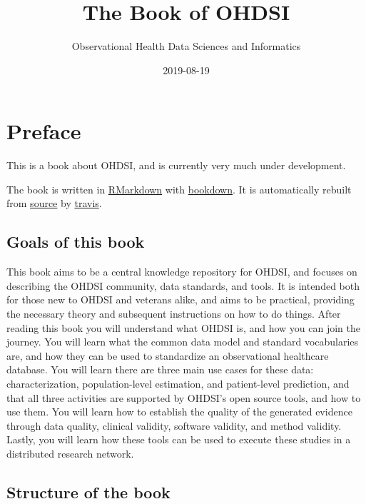 \documentclass[11pt]{book}
\title{The Book of OHDSI}
\author{Observational Health Data Sciences and Informatics}
\date{2019-08-19}
\theoremstyle{definition}
\theoremstyle{definition}
\theoremstyle{definition}
\theoremstyle{remark}
\begin{document}
\maketitle

{
\setcounter{tocdepth}{1}
\tableofcontents
}
\hypertarget{preface}{%
\chapter*{Preface}\label{preface}}

This is a book about OHDSI, and is currently very much under development.

The book is written in \href{https://rmarkdown.rstudio.com}{RMarkdown} with \href{https://bookdown.org}{bookdown}. It is automatically rebuilt from \href{https://github.com/OHDSI/TheBookOfOhdsi}{source} by \href{http://travis-ci.org/}{travis}.

\hypertarget{goals-of-this-book}{%
\section*{Goals of this book}\label{goals-of-this-book}}

This book aims to be a central knowledge repository for OHDSI, and focuses on describing the OHDSI community, data standards, and tools. It is intended both for those new to OHDSI and veterans alike, and aims to be practical, providing the necessary theory and subsequent instructions on how to do things. After reading this book you will understand what OHDSI is, and how you can join the journey. You will learn what the common data model and standard vocabularies are, and how they can be used to standardize an observational healthcare database. You will learn there are three main use cases for these data: characterization, population-level estimation, and patient-level prediction, and that all three activities are supported by OHDSI's open source tools, and how to use them. You will learn how to establish the quality of the generated evidence through data quality, clinical validity, software validity, and method validity. Lastly, you will learn how these tools can be used to execute these studies in a distributed research network.

\hypertarget{structure-of-the-book}{%
\section*{Structure of the book}\label{structure-of-the-book}}
\end{document}
